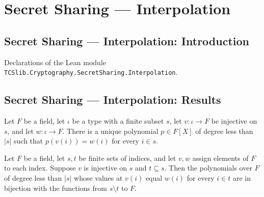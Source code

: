 \section{Secret Sharing --- Interpolation}
\subsection*{Secret Sharing --- Interpolation: Introduction}

Declarations of the Lean module \texttt{TCSlib.Cryptography.SecretSharing.Interpolation}.

\subsection*{Secret Sharing --- Interpolation: Results}

\begin{theorem}
\label{TCSlib.Interpolation.exists_unique_degreeLT_eval_eq}
\leanok
{}
Let $F$ be a field, let $\iota$ be a type with a finite subset $s$, let $v:\iota\to F$
be injective on $s$, and let $w:\iota\to F$. There is a unique polynomial $p\in F[X]$ of
degree less than $|s|$ such that $p(v(i))=w(i)$ for every $i\in s$.
\end{theorem}

\begin{definition}
\label{TCSlib.Interpolation.fixedEvalEquiv}
\leanok
Let $F$ be a field, let $s,t$ be finite sets of indices, and let $v,w$ assign elements
of $F$ to each index. Suppose $v$ is injective on $s$ and $t\subseteq s$. Then the
polynomials over $F$ of degree less than $|s|$ whose values at $v(i)$ equal $w(i)$ for
every $i\in t$ are in bijection with the functions from $s\setminus t$ to $F$.
\end{definition}

